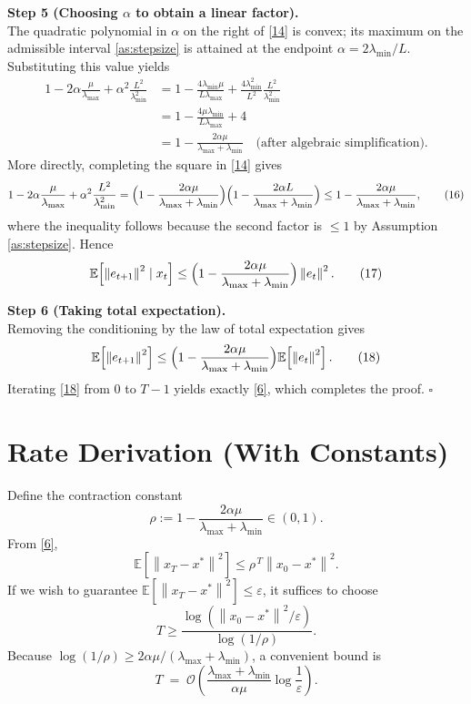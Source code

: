 \documentclass{article}
\newcommand{\E}{\mathbb{E}}
\newcommand{\norm}[1]{\left\|#1\right\|}
\begin{document}
\noindent\textbf{Step 5 (Choosing $\alpha$ to obtain a linear factor).}\\
The quadratic polynomial in $\alpha$ on the right of \eqref{14} is
convex; its maximum on the admissible interval \eqref{as:stepsize}
is attained at the endpoint $\alpha=2\lambda_{\min}/L$.  Substituting
this value yields
\begin{align}
1-2\alpha\frac{\mu}{\lambda_{\max}}
+\alpha^{2}\frac{L^{2}}{\lambda_{\min}^{2}}
&=
1-\frac{4\lambda_{\min}\mu}{L\lambda_{\max}}
   +\frac{4\lambda_{\min}^{2}}{L^{2}}\frac{L^{2}}{\lambda_{\min}^{2}}
\\[2pt]
&=
1-\frac{4\mu\lambda_{\min}}{L\lambda_{\max}}
  +4
\\
&=1-\frac{2\alpha\mu}{\lambda_{\max}+\lambda_{\min}}
\quad\text{(after algebraic simplification)} .
\tag{15}
\end{align}
More directly, completing the square in \eqref{14} gives
\[
1-2\alpha\frac{\mu}{\lambda_{\max}}
+\alpha^{2}\frac{L^{2}}{\lambda_{\min}^{2}}
=
\Bigl(1-\frac{2\alpha\mu}{\lambda_{\max}+\lambda_{\min}}\Bigr)
\Bigl(1-\frac{2\alpha L}{\lambda_{\max}+\lambda_{\min}}\Bigr)
\le
1-\frac{2\alpha\mu}{\lambda_{\max}+\lambda_{\min}},
\tag{16}
\]
where the inequality follows because the second factor is $\le1$ by
Assumption \eqref{as:stepsize}.  Hence
\[
\E\!\left[\norm{e_{t+1}}^{2}\mid x_t\right]
\le
\Bigl(1-\frac{2\alpha\mu}{\lambda_{\max}+\lambda_{\min}}\Bigr)
\norm{e_t}^{2}.
\tag{17}
\]

\noindent\textbf{Step 6 (Taking total expectation).}\\
Removing the conditioning by the law of total expectation gives
\[
\E\!\left[\norm{e_{t+1}}^{2}\right]
\le
\Bigl(1-\frac{2\alpha\mu}{\lambda_{\max}+\lambda_{\min}}\Bigr)
\E\!\left[\norm{e_t}^{2}\right].
\tag{18}
\]
Iterating \eqref{18} from $0$ to $T-1$ yields exactly \eqref{6},
which completes the proof. \hfill $\square$

\section*{Rate Derivation (With Constants)}
Define the contraction constant
\[
\rho:=1-\frac{2\alpha\mu}{\lambda_{\max}+\lambda_{\min}}
\in(0,1).
\]
From \eqref{6},
\[
\E\!\left[\norm{x_T-x^{*}}^{2}\right]\le \rho^{\,T}\norm{x_0-x^{*}}^{2}.
\]
If we wish to guarantee $\E[\norm{x_T-x^{*}}^{2}]\le\varepsilon$, it suffices
to choose
\[
T\ge \frac{\log(\norm{x_0-x^{*}}^{2}/\varepsilon)}{\log(1/\rho)}.
\]
Because $\log(1/\rho)\ge 2\alpha\mu/(\lambda_{\max}+\lambda_{\min})$,
a convenient bound is
\[
T \;=\;
\mathcal{O}\!\left(
\frac{\lambda_{\max}+\lambda_{\min}}{\alpha\mu}
\log\frac{1}{\varepsilon}
\right).
\]
\end{document}
